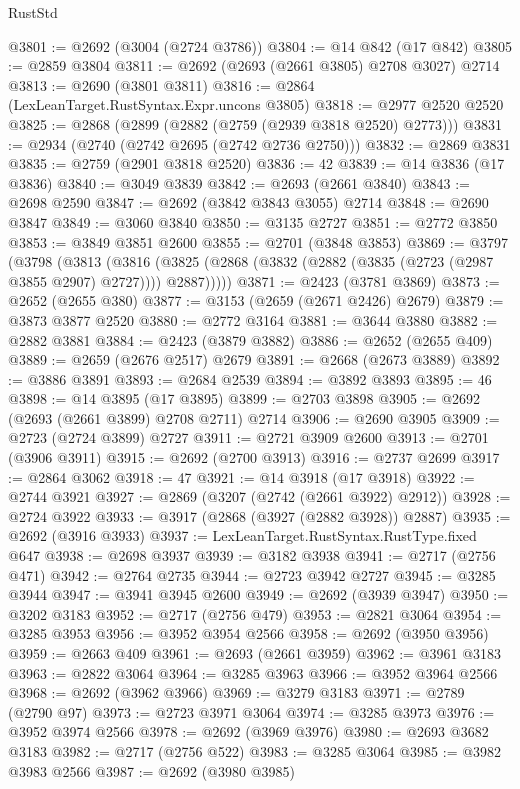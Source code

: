 \begin{lexlean}{RustStd}
\begin{coremodule}
{\begin{coremodule}
{{{{{{{{{{{{{{{{{{{{{{{{{{{{{{{{{{{{{{{@3801 := @2692 (@3004 (@2724 @3786))
@3804 := @14 @842 (@17 @842)
@3805 := @2859 @3804
@3811 := @2692 (@2693 (@2661 @3805) @2708 @3027) @2714
@3813 := @2690 (@3801 @3811)
@3816 := @2864 (LexLeanTarget.RustSyntax.Expr.uncons @3805)
@3818 := @2977 @2520 @2520
@3825 := @2868 (@2899 (@2882 (@2759 (@2939 @3818 @2520) @2773)))
@3831 := @2934 (@2740 (@2742 @2695 (@2742 @2736 @2750)))
@3832 := @2869 @3831
@3835 := @2759 (@2901 @3818 @2520)
@3836 := 42
@3839 := @14 @3836 (@17 @3836)
@3840 := @3049 @3839
@3842 := @2693 (@2661 @3840)
@3843 := @2698 @2590
@3847 := @2692 (@3842 @3843 @3055) @2714
@3848 := @2690 @3847
@3849 := @3060 @3840
@3850 := @3135 @2727
@3851 := @2772 @3850
@3853 := @3849 @3851 @2600
@3855 := @2701 (@3848 @3853)
@3869 := @3797
    (@3798
      (@3813
        (@3816 (@3825 (@2868 (@3832 (@2882 (@3835 (@2723 (@2987 @3855 @2907) @2727)))) @2887)))))
@3871 := @2423 (@3781 @3869)
@3873 := @2652 (@2655 @380)
@3877 := @3153 (@2659 (@2671 @2426) @2679)
@3879 := @3873 @3877 @2520
@3880 := @2772 @3164
@3881 := @3644 @3880
@3882 := @2882 @3881
@3884 := @2423 (@3879 @3882)
@3886 := @2652 (@2655 @409)
@3889 := @2659 (@2676 @2517) @2679
@3891 := @2668 (@2673 @3889)
@3892 := @3886 @3891
@3893 := @2684 @2539
@3894 := @3892 @3893
@3895 := 46
@3898 := @14 @3895 (@17 @3895)
@3899 := @2703 @3898
@3905 := @2692 (@2693 (@2661 @3899) @2708 @2711) @2714
@3906 := @2690 @3905
@3909 := @2723 (@2724 @3899) @2727
@3911 := @2721 @3909 @2600
@3913 := @2701 (@3906 @3911)
@3915 := @2692 (@2700 @3913)
@3916 := @2737 @2699
@3917 := @2864 @3062
@3918 := 47
@3921 := @14 @3918 (@17 @3918)
@3922 := @2744 @3921
@3927 := @2869 (@3207 (@2742 (@2661 @3922) @2912))
@3928 := @2724 @3922
@3933 := @3917 (@2868 (@3927 (@2882 @3928)) @2887)
@3935 := @2692 (@3916 @3933)
@3937 := LexLeanTarget.RustSyntax.RustType.fixed @647
@3938 := @2698 @3937
@3939 := @3182 @3938
@3941 := @2717 (@2756 @471)
@3942 := @2764 @2735
@3944 := @2723 @3942 @2727
@3945 := @3285 @3944
@3947 := @3941 @3945 @2600
@3949 := @2692 (@3939 @3947)
@3950 := @3202 @3183
@3952 := @2717 (@2756 @479)
@3953 := @2821 @3064
@3954 := @3285 @3953
@3956 := @3952 @3954 @2566
@3958 := @2692 (@3950 @3956)
@3959 := @2663 @409
@3961 := @2693 (@2661 @3959)
@3962 := @3961 @3183
@3963 := @2822 @3064
@3964 := @3285 @3963
@3966 := @3952 @3964 @2566
@3968 := @2692 (@3962 @3966)
@3969 := @3279 @3183
@3971 := @2789 (@2790 @97)
@3973 := @2723 @3971 @3064
@3974 := @3285 @3973
@3976 := @3952 @3974 @2566
@3978 := @2692 (@3969 @3976)
@3980 := @2693 @3682 @3183
@3982 := @2717 (@2756 @522)
@3983 := @3285 @3064
@3985 := @3982 @3983 @2566
@3987 := @2692 (@3980 @3985)
}}}}}}}}}}}}}}}}}}}}}}}}}}}}}}}}}}}}}}}
\end{coremodule}}
\end{coremodule}
\end{lexlean}
